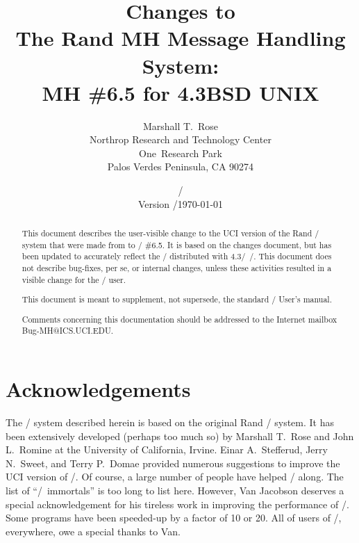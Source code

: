 





\title{Changes to\\ The Rand MH Message Handling System:\\
	MH \#6.5 for 4.3BSD UNIX}
\author{Marshall T.~Rose\\
	Northrop Research and Technology Center\\
	One~Research Park\\
	Palos Verdes Peninsula, CA  90274}
\date{\ifdraft \versiondate/\\ Version \versiontag/\else \today\fi}
\maketitle
{}

\begin{abstract}
This document describes the user-visible change to the
UCI version of the Rand \MH/ system that were made from  to \MH/ \#6.5.
It is based on the  changes document,
but has been updated to accurately reflect the \MH/ distributed with
4.3\bsd/~\unix/.
This document does not describe bug-fixes, per se,
or internal changes,
unless these activities resulted in a visible change for the \MH/ user.

This document is meant to supplement,
not supersede, the standard \MH/ User's manual\cite{MH.USR}.

Comments concerning this documentation should be addressed to the Internet
mailbox {\sf Bug-MH@ICS.UCI.EDU}.
\end{abstract}

\newpage
\section*	{Acknowledgements}
The \MH/ system described herein is based on the original Rand \MH/ system.
It has been extensively developed (perhaps too much so) by Marshall T.~Rose
and John L.~Romine at the University of California, Irvine.
Einar A.~Stefferud, Jerry N.~Sweet,
and Terry P.~Domae provided numerous suggestions
to improve the UCI version of \MH/.
Of course,
a large number of people have helped \MH/ along.
The list of ``\MH/~immortals'' is too long to list here.
However, Van Jacobson deserves a special acknowledgement for his tireless
work in improving the performance of \MH/.
Some programs have been speeded-up by a factor of 10 or 20.
All of users of \MH/, everywhere, owe a special thanks to Van.

